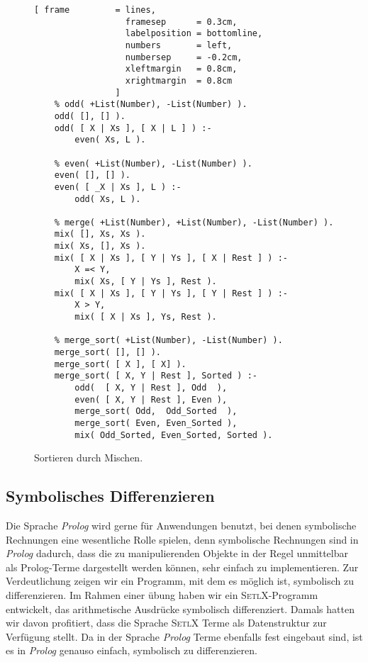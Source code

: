 \begin{figure}[!h]
  \centering
\begin{Verbatim}[ frame         = lines, 
                  framesep      = 0.3cm, 
                  labelposition = bottomline,
                  numbers       = left,
                  numbersep     = -0.2cm,
                  xleftmargin   = 0.8cm,
                  xrightmargin  = 0.8cm
                ]
    % odd( +List(Number), -List(Number) ).
    odd( [], [] ).    
    odd( [ X | Xs ], [ X | L ] ) :-
        even( Xs, L ).
    
    % even( +List(Number), -List(Number) ).
    even( [], [] ).
    even( [ _X | Xs ], L ) :-
        odd( Xs, L ).
    
    % merge( +List(Number), +List(Number), -List(Number) ).
    mix( [], Xs, Xs ).    
    mix( Xs, [], Xs ).
    mix( [ X | Xs ], [ Y | Ys ], [ X | Rest ] ) :-
        X =< Y,
        mix( Xs, [ Y | Ys ], Rest ).    
    mix( [ X | Xs ], [ Y | Ys ], [ Y | Rest ] ) :-
        X > Y,
        mix( [ X | Xs ], Ys, Rest ).
    
    % merge_sort( +List(Number), -List(Number) ).    
    merge_sort( [], [] ).
    merge_sort( [ X ], [ X] ).    
    merge_sort( [ X, Y | Rest ], Sorted ) :-
        odd(  [ X, Y | Rest ], Odd  ),
        even( [ X, Y | Rest ], Even ),
        merge_sort( Odd,  Odd_Sorted  ),
        merge_sort( Even, Even_Sorted ),
        mix( Odd_Sorted, Even_Sorted, Sorted ).
\end{Verbatim}
\vspace*{-0.3cm}
  \caption{Sortieren durch Mischen.}
  \label{fig:merge-sort}
\end{figure}


\subsection{Symbolisches Differenzieren}
Die Sprache \textsl{Prolog} wird gerne f\"{u}r Anwendungen benutzt, bei denen symbolische
Rechnungen eine wesentliche Rolle spielen, denn 
symbolische Rechnungen sind in \textsl{Prolog} dadurch, dass die zu
manipulierenden Objekte in der Regel unmittelbar als Prolog-Terme dargestellt werden
k\"{o}nnen, sehr einfach zu implementieren.  Zur Verdeutlichung zeigen wir ein Programm, mit
dem es m\"{o}glich ist, symbolisch zu differenzieren. 
Im Rahmen einer \"{u}bung haben wir ein \textsc{SetlX}-Programm entwickelt, das arithmetische Ausdr\"{u}cke
symbolisch differenziert.  Damals hatten wir davon profitiert, dass die Sprache \textsc{SetlX} Terme
als Datenstruktur zur Verf\"{u}gung stellt.  Da in der Sprache \textsl{Prolog} Terme ebenfalls fest
eingebaut sind, ist es in
\textsl{Prolog} genauso einfach, symbolisch zu differenzieren.

